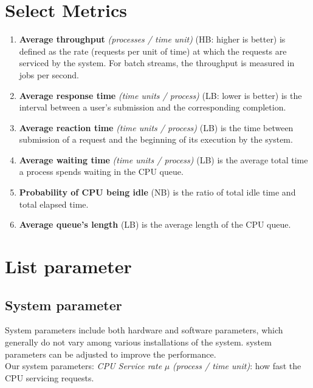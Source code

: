 \documentclass[13pt,a4paper]{article}
\begin{document}
	\section{Select Metrics}
		\begin{enumerate}[-]
			\item \textbf{Average throughput} \textit{(processes / time unit)} (HB: higher is better) is defined as the rate (requests per unit of time) at which the requests are serviced by the system. For batch streams, the throughput is measured in jobs per second. 
			\item \textbf{Average response time} \textit{(time units / process)} (LB: lower is better) is the interval between a user’s submission and the corresponding completion.
			\item \textbf{Average reaction time} \textit{(time units / process)} (LB) is the time between submission of a request and the beginning of its execution by the system.
			\item \textbf{Average waiting time} \textit{(time units / process)}  (LB) is the average total time a process spends waiting in the CPU queue.
			\item \textbf{Probability of CPU being idle} (NB) is the ratio of total idle time and total elapsed time.
			\item \textbf{Average queue’s length} (LB) is the average length of the CPU queue.
		\end{enumerate}
	\section{List parameter}
		\subsection{System parameter}
			System parameters include both hardware and software parameters, which generally do not vary among various installations of the system. system parameters can be adjusted to improve the performance.\\
			Our system parameters: \textit{CPU Service rate} $\mu$ \textit{(process / time unit)}: how fast the CPU servicing requests.
\end{document}

